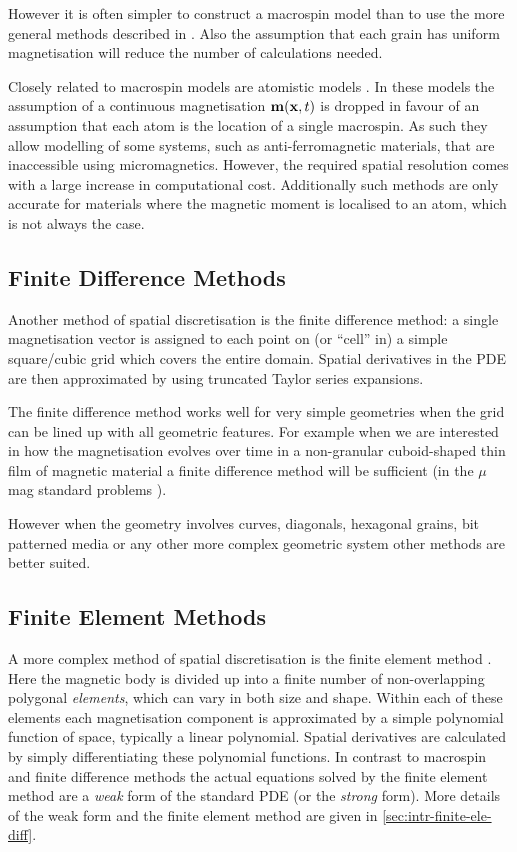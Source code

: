However it is often simpler to construct a macrospin model than to use the more general methods described in .
Also the assumption that each grain has uniform magnetisation will reduce the number of calculations needed.

Closely related to macrospin models are atomistic models \cite{Evans2014}.
In these models the assumption of a continuous magnetisation $\mathbf{m}(\mathbf{x}, t)$ is dropped in favour of an assumption that each atom is the location of a single macrospin.
As such they allow modelling of some systems, such as anti-ferromagnetic materials, that are inaccessible using micromagnetics.
However, the required spatial resolution comes with a large increase in computational cost.
Additionally  such methods are only accurate for materials where the magnetic moment is localised to an atom, which is not always the case.


\subsection{Finite Difference Methods}
\label{sec:sd-finite-diff-meth}

Another method of spatial discretisation is the finite difference method: a single magnetisation vector is assigned to each point on (or ``cell'' in) a simple square/cubic grid which covers the entire domain.
Spatial derivatives in the PDE are then approximated by using truncated Taylor series expansions.

The finite difference method works well for very simple geometries when the grid can be lined up with all geometric features.
For example when we are interested in how the magnetisation evolves over time in a non-granular cuboid-shaped thin film of magnetic material a finite difference method will be sufficient (\eg in the $\mu$mag standard problems \cite{mumag-website}).

However when the geometry involves curves, diagonals, hexagonal grains, bit patterned media or any other more complex geometric system other methods are better suited.


\subsection{Finite Element Methods}
\label{sec:sd-finite-elem-meth}

A more complex method of spatial discretisation is the finite element method \cite{HowardElmanDavidSilvester2006}.
Here the magnetic body is divided up into a finite number of non-overlapping polygonal \emph{elements}, which can vary in both size and shape.
Within each of these elements each magnetisation component is approximated by a simple polynomial function of space, typically a linear polynomial.
Spatial derivatives are calculated by simply differentiating these polynomial functions.
In contrast to macrospin and finite difference methods the actual equations solved by the finite element method are a \emph{weak} form of the standard PDE (or the \emph{strong} form).
More details of the weak form and the finite element method are given in \cref{sec:intr-finite-ele-diff}.

